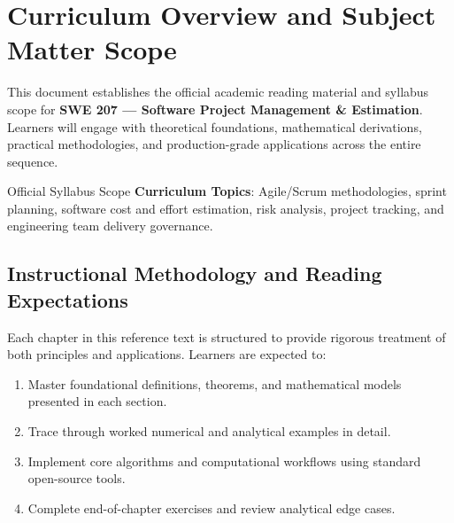 \section{Curriculum Overview and Subject Matter Scope}

This document establishes the official academic reading material and syllabus scope for \textbf{SWE 207 --- Software Project Management \& Estimation}. Learners will engage with theoretical foundations, mathematical derivations, practical methodologies, and production-grade applications across the entire sequence.

\begin{InsightBox}{Official Syllabus Scope}
  \textbf{Curriculum Topics}: Agile/Scrum methodologies, sprint planning, software cost and effort estimation, risk analysis, project tracking, and engineering team delivery governance.
\end{InsightBox}

\subsection{Instructional Methodology and Reading Expectations}

Each chapter in this reference text is structured to provide rigorous treatment of both principles and applications. Learners are expected to:
\begin{enumerate}
  \item Master foundational definitions, theorems, and mathematical models presented in each section.
  \item Trace through worked numerical and analytical examples in detail.
  \item Implement core algorithms and computational workflows using standard open-source tools.
  \item Complete end-of-chapter exercises and review analytical edge cases.
\end{enumerate}

